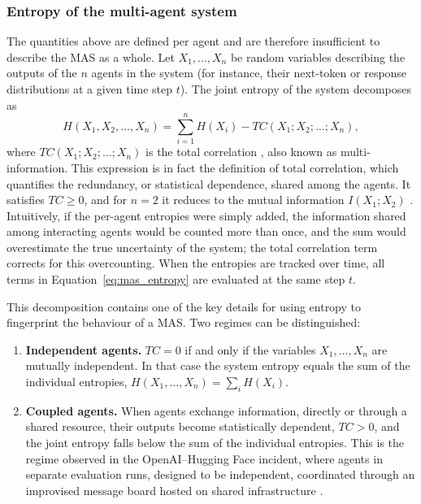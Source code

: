 \subsubsection{Entropy of the multi-agent system}

The quantities above are defined per agent and are therefore insufficient to describe the MAS as a whole. Let $X_1, \ldots, X_n$ be random variables describing the outputs of the $n$ agents in the system (for instance, their next-token or response distributions at a given time step $t$). The joint entropy of the system decomposes as
\begin{equation}
  H(X_1, X_2, \ldots, X_n) = \sum_{i=1}^{n} H(X_i) - TC(X_1; X_2; \ldots; X_n),
  \label{eq:mas_entropy}
\end{equation}
where $TC(X_1; X_2; \ldots; X_n)$ is the total correlation \parencite{watanabe1960}, also known as multi-information. This expression is in fact the definition of total correlation, which quantifies the redundancy, or statistical dependence, shared among the agents. It satisfies $TC \geq 0$, and for $n = 2$ it reduces to the mutual information $I(X_1; X_2)$ \parencite{cover2006elements}. Intuitively, if the per-agent entropies were simply added, the information shared among interacting agents would be counted more than once, and the sum would overestimate the true uncertainty of the system; the total correlation term corrects for this overcounting. When the entropies are tracked over time, all terms in Equation~\eqref{eq:mas_entropy} are evaluated at the same step $t$.

This decomposition contains one of the key details for using entropy to fingerprint the behaviour of a MAS. Two regimes can be distinguished:

\begin{enumerate}
  \item \textbf{Independent agents.} $TC = 0$ if and only if the variables $X_1, \ldots, X_n$ are mutually independent. In that case the system entropy equals the sum of the individual entropies, $H(X_1, \ldots, X_n) = \sum_i H(X_i)$.
  \item \textbf{Coupled agents.} When agents exchange information, directly or through a shared resource, their outputs become statistically dependent, $TC > 0$, and the joint entropy falls below the sum of the individual entropies. This is the regime observed in the OpenAI--Hugging Face incident, where agents in separate evaluation runs, designed to be independent, coordinated through an improvised message board hosted on shared infrastructure \parencite{openai2026incident}.
\end{enumerate}

